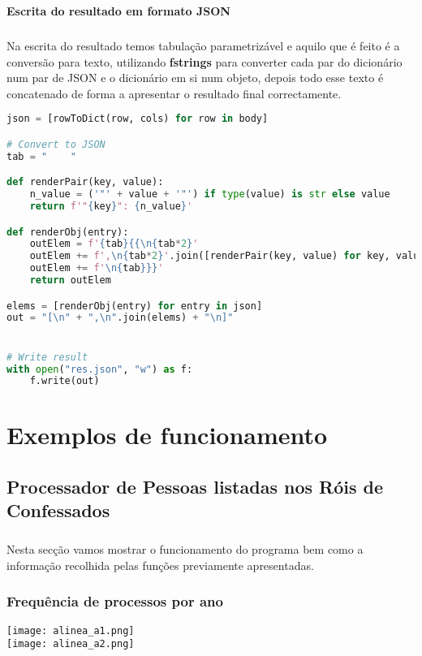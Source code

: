 \documentclass[11pt,a4paper]{report}
\begin{document}
\item \textbf{Escrita do resultado em formato JSON}
\paragraph{}
Na escrita do resultado temos tabulação parametrizável e aquilo que é feito é a conversão para texto,  
utilizando \textbf{fstrings} para converter cada par do dicionário num par de JSON e o dicionário em si num objeto, depois todo esse texto é concatenado de forma a apresentar o resultado final correctamente.

\begin{lstlisting}[language=Python]
json = [rowToDict(row, cols) for row in body]

# Convert to JSON
tab = "    "

def renderPair(key, value):
    n_value = ('"' + value + '"') if type(value) is str else value
    return f'"{key}": {n_value}'

def renderObj(entry):
    outElem = f'{tab}{{\n{tab*2}'
    outElem += f',\n{tab*2}'.join([renderPair(key, value) for key, value in entry.items()])
    outElem += f'\n{tab}}}'
    return outElem

elems = [renderObj(entry) for entry in json]
out = "[\n" + ",\n".join(elems) + "\n]"


# Write result
with open("res.json", "w") as f:
    f.write(out)

\end{lstlisting}
    
    \chapter{Exemplos de funcionamento}
    \section{Processador de Pessoas listadas nos Róis de Confessados}
    \paragraph{}
    Nesta secção vamos mostrar o funcionamento do programa bem como a informação recolhida pelas funções previamente apresentadas.
    \subsection{Frequência de processos por ano}
    \texttt{[image: alinea\_a1.png]} \\
	\texttt{[image: alinea\_a2.png]}
\end{document}
